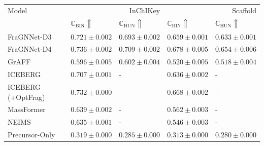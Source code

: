 \begin{tabular}{lllll}
\toprule
Model & \multicolumn{2}{r}{InChIKey} & \multicolumn{2}{r}{Scaffold} \\
 & $\mathbb{C}_\text{BIN} \Uparrow$ & $\mathbb{C}_\text{HUN} \Uparrow$ & $\mathbb{C}_\text{BIN} \Uparrow$ & $\mathbb{C}_\text{HUN} \Uparrow$ \\
\midrule
FraGNNet-D3 & $0.721 \pm 0.002$ & $0.693 \pm 0.002$ & $0.659 \pm 0.001$ & $0.633 \pm 0.001$ \\
FraGNNet-D4 & $0.736 \pm 0.002$ & $0.709 \pm 0.002$ & $0.678 \pm 0.005$ & $0.654 \pm 0.006$ \\
GrAFF & $0.596 \pm 0.005$ & $0.602 \pm 0.004$ & $0.520 \pm 0.005$ & $0.518 \pm 0.004$ \\
ICEBERG & $0.707 \pm 0.001$ & - & $0.636 \pm 0.002$ & - \\
ICEBERG (+OptFrag) & $0.732 \pm 0.000$ & - & $0.668 \pm 0.002$ & - \\
MassFormer & $0.639 \pm 0.002$ & - & $0.562 \pm 0.003$ & - \\
NEIMS & $0.635 \pm 0.001$ & - & $0.546 \pm 0.003$ & - \\
Precursor-Only & $0.319 \pm 0.000$ & $0.285 \pm 0.000$ & $0.313 \pm 0.000$ & $0.280 \pm 0.000$ \\
\bottomrule
\end{tabular}
